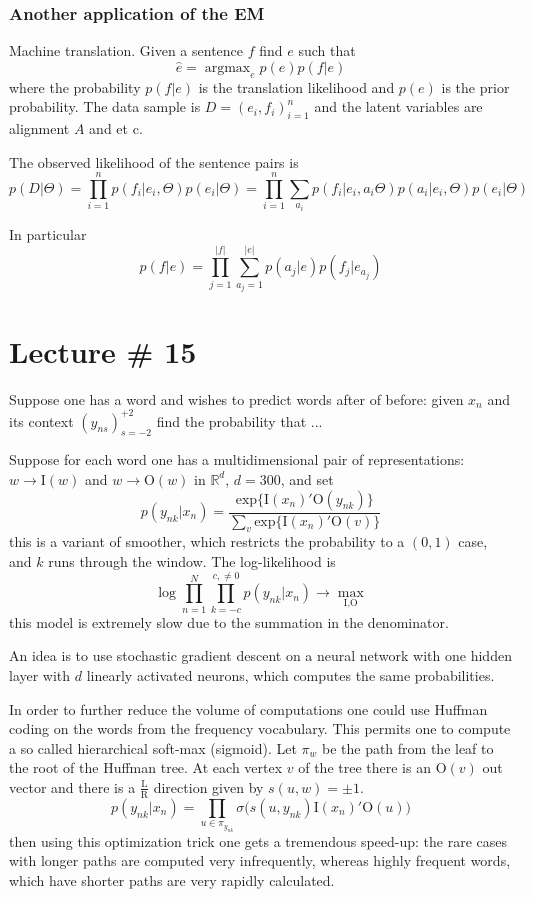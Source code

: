 \documentclass[a4paper]{article}
\newcommand{\Real}{\mathbb{R}}
\newcommand{\argmax}{\mathop{\text{argmax}}}
\begin{document}

\subsubsection{Another application of the EM} %
\label{ssub:another_application_of_the_em}

Machine translation. Given a sentence $f$ find $e$ such that
\[ \hat{e} = \argmax_e p(e) p(f|e)\]
where the probability $p(f|e)$ is the translation likelihood and $p(e)$ is the 
prior probability. The data sample is $D = (e_i,f_i)_{i=1}^n$ and the latent variables
are alignment $A$ and et c.

The observed likelihood of the sentence pairs is
\[
p(D|\Theta)
= \prod_{i=1}^n p(f_i|e_i,\Theta) p(e_i|\Theta)
= \prod_{i=1}^n \sum_{a_i} p(f_i|e_i,a_i\Theta) p(a_i|e_i,\Theta) p(e_i|\Theta)
\]

In particular
\[
p(f|e) = \prod_{j=1}^{|f|} \sum_{a_j=1}^{|e|} p(a_j|e) p(f_j|e_{a_j})
\]


\section{Lecture \# 15} %
\label{sec:lecture_15}

Suppose one has a word and wishes to predict words after of before: given $x_n$
and its context $(y_{ns})_{s=-2}^{+2}$ find the probability that ...


Suppose for each word one has a multidimensional pair of representations:
$w\to \text{I}(w)$ and $w\to \text{O}(w)$ in $\Real^d$, $d = 300$, and set
\[
p(y_{nk} | x_n)
= \frac{ \text{exp}\{ \text{I}(x_n)'\text{O}(y_{nk}) \} }{\sum_v \text{exp}\{ \text{I}(x_n)'\text{O}(v) \}}
\]
this is a variant of smoother, which restricts the probability to a $(0,1)$ case,
and $k$ runs through the window. The log-likelihood is
\[
\log \prod_{n=1}^N \prod_{k=-c}^{c,\neq 0} p(y_{nk} | x_n) \to \max_{\text{I},\text{O}}
\]
this model is extremely slow due to the summation in the denominator.

An idea is to use stochastic gradient descent on a neural network with one hidden
layer with $d$ linearly activated neurons, which computes the same probabilities.

In order to further reduce the volume of computations one could use Huffman coding
on the words from the frequency vocabulary. This permits one to compute a so called
hierarchical soft-max (sigmoid). Let $\pi_w$ be the path from the leaf to the root
of the Huffman tree. At each vertex $v$ of the tree there is an $\text{O}(v)$ out
vector and there is a $\tfrac{\text{L}}{\text{R}}$ direction given by $s(u,w)=\pm1$.
\[
p(y_{nk} | x_n)
= \prod_{u\in\pi_{y_{nk}}} \sigma\bigl( s(u,y_{nk}) \text{I}(x_n)'\text{O}(u)\bigr)
\]
then using this optimization trick one gets a tremendous speed-up: the rare cases
with longer paths are computed very infrequently, whereas highly frequent words,
which have shorter paths are very rapidly calculated.

\end{document}
